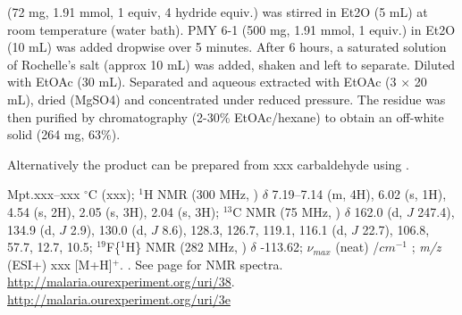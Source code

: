 \documentclass[12pt, a4paper,titlepage]{article}
\begin{document}
{ (72 mg, 1.91 mmol, 1 equiv, 4 hydride equiv.) was stirred in Et2O (5 mL) at room temperature (water bath). PMY 6-1 (500 mg, 1.91 mmol, 1 equiv.) in Et2O (10 mL) was added dropwise over 5 minutes. After 6 hours, a saturated solution of Rochelle's salt (approx 10 mL) was added, shaken and left to separate. Diluted with EtOAc (30 mL). Separated and aqueous extracted with EtOAc (3 × 20 mL), dried (MgSO4) and concentrated under reduced pressure. The residue was then purified by chromatography (2-30\% EtOAc/hexane) to obtain an off-white solid (264 mg, 63\%). 

Alternatively the product can be prepared from xxx carbaldehyde using .

Mpt.xxx--xxx $^\circ$C (xxx); 
$^1$H NMR (300 MHz, ) $\delta$ 7.19--7.14 (m, 4H), 6.02 (s, 1H), 4.54 (s, 2H), 2.05 (s, 3H), 2.04 (s, 3H); 
  $^{13}$C NMR (75 MHz, ) $\delta$ 162.0 (d, $J$ 247.4), 134.9 (d, $J$ 2.9), 130.0 (d, $J$ 8.6), 128.3, 126.7, 119.1, 116.1 (d, $J$ 22.7), 106.8, 57.7, 12.7, 10.5; 
$^{19}$F\{$^1$H\} NMR (282 MHz, ) $\delta$ -113.62;
 $\nu_{max}$ (neat) /$cm^{-1}$ ; 
\emph{m/z} (ESI+) xxx [M+H]$^+$.
. 
See page \pageref{spec:PMY15} for NMR spectra.
\url{http://malaria.ourexperiment.org/uri/38}.  \url{http://malaria.ourexperiment.org/uri/3e}









}
\end{document}
